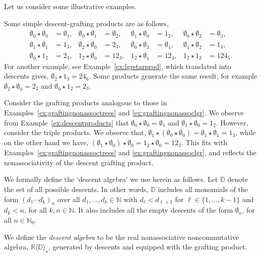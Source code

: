 \documentclass[5p,twocolumn]{elsarticle}
\newcommand*{\R}{\mathbb R}
\begin{document}
%
Let us consider some illustrative examples.
%
\begin{example}\label{ex:descentproducts}
  Some simple descent-grafting products are as follows,
  \begin{align*}
    \emptyset_0\star\emptyset_0&=\emptyset_1, &\!\!\! \emptyset_0\star\emptyset_1&=\emptyset_2,  &\!\!\!  \emptyset_1\star\emptyset_0&=1_2,         &\!\!\!  \emptyset_0\star\emptyset_2&=\emptyset_3,\\
    \emptyset_1\star\emptyset_1&=1_3,         &\!\!\!  \emptyset_2\star\emptyset_0&=2_3,         &\!\!\!  \emptyset_0\star\emptyset_3&=\emptyset_4, &\!\!\!  \emptyset_1\star\emptyset_2&=1_4,\\
    \emptyset_0\star1_2&=2_3,                 &\!\!\!  1_2\star\emptyset_0&=12_3,                &\!\!\!  1_2\star\emptyset_1&=12_4,                &\!\!\!  1_2\star1_2&=124_5.
  \end{align*}
  For another example, see Example~\ref{ex:lgrstarprod}, which translated into descents gives, $\emptyset_2\star1_3=24_6$.
  Some products generate the same result, for example $\emptyset_2\star\emptyset_0=2_3$ and $\emptyset_0\star1_2=2_3$.
\end{example}
%
\begin{example}[Nonassociativity]\label{ex:graftingnonassocdescents}
  Consider the grafting products analogous to those in Examples~\ref{ex:graftingnonassoctrees} and \ref{ex:graftingnonassoclgr}.
  We observe from Example~\ref{ex:descentproducts} that $\emptyset_0\star\emptyset_0=\emptyset_1$ and $\emptyset_1\star\emptyset_0=1_2$.
  However, consider the triple products. We observe that,
  $\emptyset_1\star(\emptyset_0\star\emptyset_0)=\emptyset_1\star\emptyset_1=1_3$, while on the other hand we have, $(\emptyset_1\star\emptyset_0)\star\emptyset_0=1_2\star\emptyset_0=12_3$.
  This fits with Examples~\ref{ex:graftingnonassoctrees} and \ref{ex:graftingnonassoclgr}, and reflects the nonassociativity of the descent grafting product.
\end{example}
%

We formally define the `descent algebra' we use herein as follows. Let $\mathbb D$ denote the set of all possible descents.
In other words, $\mathbb D$ includes all monomials of the form $(d_1\cdots d_k)_n$ over all $d_1,\ldots,d_k\in\mathbb N$ with $d_\ell<d_{\ell+1}$ for $\ell\in\{1,\ldots,k-1\}$ and $d_k<n$, for all $k,n\in\mathbb N$.
It also includes all the empty descents of the form $\emptyset_n$, for all $n\in\mathbb N_0$.
%
\begin{definition}\label{def:descent-alg}
  We define the \emph{descent algebra} to be the real nonassociative noncommutative algebra, $\R\langle\mathbb D\rangle_\star$, generated by descents and equipped with the grafting product.
\end{definition}
%
\end{document}
